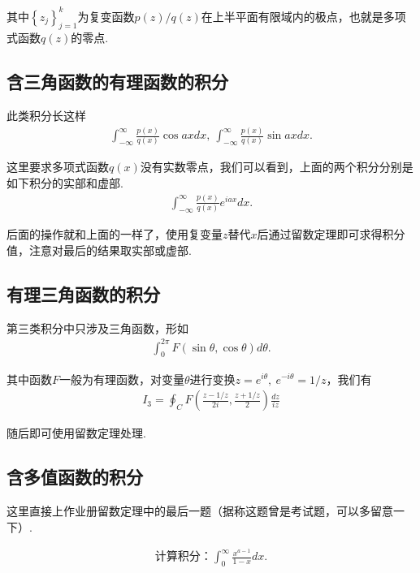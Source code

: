     其中$\left\{z_j\right\}_{j=1}^{k}$为复变函数$p(z)/q(z)$在上半平面有限域内的极点，也就是多项式函数$q(z)$的零点.

    \subsection{含三角函数的有理函数的积分}

    此类积分长这样
    \begin{align*}
        \int_{-\infty}^{\infty}\frac{p(x)}{q(x)}\cos{ax}dx,\ \int_{-\infty}^{\infty}\frac{p(x)}{q(x)}\sin{ax}dx.
    \end{align*}

    这里要求多项式函数$q(x)$没有实数零点，我们可以看到，上面的两个积分分别是如下积分的实部和虚部.
    \begin{align*}
        \int_{-\infty}^{\infty}\frac{p(x)}{q(x)}e^{iax}dx.
    \end{align*}

    后面的操作就和上面的一样了，使用复变量$z$替代$x$后通过留数定理即可求得积分值，注意对最后的结果取实部或虚部.

    \subsection{有理三角函数的积分}

    第三类积分中只涉及三角函数，形如
    \begin{align*}
        \int_{0}^{2\pi}F(\sin{\theta},\cos{\theta})d\theta.
    \end{align*}

    其中函数$F$一般为有理函数，对变量$\theta$进行变换$z=e^{i\theta},\ e^{-i\theta}=1/z$，我们有
    \begin{align*}
        I_3=\oint_{C}F\left(\frac{z-1/z}{2i}, \frac{z+1/z}{2}\right)\frac{dz}{iz}
    \end{align*}

    随后即可使用留数定理处理.

    \subsection{含多值函数的积分}

        这里直接上作业册留数定理中的最后一题（据称这题曾是考试题，可以多留意一下）.
        \begin{example}\label{ex:multi_valued}
            \begin{align*}
            \text{计算积分：}\int_0^\infty \frac{x^{a-1}}{1-x}dx.
            \end{align*}
        \end{example}

